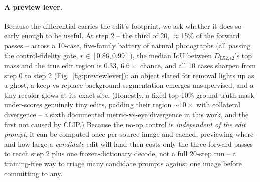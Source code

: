 \paragraph{A preview lever.} Because the differential carries the edit's
footprint, we ask whether it does so early enough to be useful. At step 2
-- the third of 20, $\approx$15\% of the forward passes -- across a
10-case, five-family battery of natural photographs (all passing the
control-fidelity gate, $r\in[0.86,0.99]$), the median IoU between
$D_{\text{L52},t2}$'s top mass and the true edit region is $0.33$,
$6.6\times$ chance, and all 10 cases sharpen from step 0 to step 2
(Fig.~\ref{fig:previewlever}): an object slated for removal lights up as a
ghost, a keep-vs-replace background segmentation emerges unsupervised, and
a tiny recolor glows at its exact site. (Honestly, a fixed top-10\%
ground-truth mask under-scores genuinely tiny edits, padding their region
${\sim}10\times$ with collateral divergence -- a sixth documented
metric-vs-eye divergence in this work, and the first not caused by CLIP.)
Because the no-op control is \emph{independent of the edit prompt}, it can
be computed once per source image and cached; previewing where and how
large a \emph{candidate} edit will land then costs only the three forward
passes to reach step 2 plus one frozen-dictionary decode, not a full
20-step run -- a training-free way to triage many candidate prompts
against one image before committing to any.

